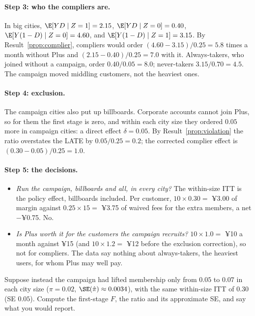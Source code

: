 \documentclass[11pt]{article}
\begin{document}
\paragraph{Step 3: who the compliers are.} In big cities, $\E[YD \mid Z=1] = 2.15$, $\E[YD \mid Z=0] = 0.40$,
$\E[Y(1-D) \mid Z=0] = 4.60$, and $\E[Y(1-D) \mid Z=1] = 3.15$. By Result~\ref{prop:complier}, compliers would order
$(4.60 - 3.15)/0.25 = 5.8$ times a month without Plus and $(2.15 - 0.40)/0.25 = 7.0$ with it. Always-takers, who joined
without a campaign, order $0.40/0.05 = 8.0$; never-takers $3.15/0.70 = 4.5$. The campaign moved middling customers, not the
heaviest ones.

\paragraph{Step 4: exclusion.} The campaign cities also put up billboards. Corporate accounts cannot join Plus, so for them the
first stage is zero, and within each city size they ordered $0.05$ more in campaign cities: a direct effect $\delta = 0.05$.
By Result~\ref{prop:violation} the ratio overstates the LATE by $0.05/0.25 = 0.2$; the corrected complier effect is
$(0.30 - 0.05)/0.25 = 1.0$.

\paragraph{Step 5: the decisions.}
\begin{itemize}
  \item \emph{Run the campaign, billboards and all, in every city?} The within-size ITT is the policy effect, billboards
  included. Per customer, $10 \times 0.30 = $ ¥3.00 of margin against $0.25 \times 15 = $ ¥3.75 of waived fees for the extra
  members, a net $-$¥0.75. No.
  \item \emph{Is Plus worth it for the customers the campaign recruits?} $10 \times 1.0 = $ ¥10 a month against ¥15 (and
  $10 \times 1.2 = $ ¥12 before the exclusion correction), so not for compliers. The data say nothing about always-takers, the
  heaviest users, for whom Plus may well pay.
\end{itemize}

\begin{exercise}[computation]
Suppose instead the campaign had lifted membership only from $0.05$ to $0.07$ in each city size ($\pi = 0.02$, $\SE(\hat\pi) \approx 0.0034$),
with the same within-size ITT of $0.30$ (SE $0.05$). Compute the first-stage $F$, the ratio and its approximate SE, and say what you would
report.
\end{exercise}
\end{document}
